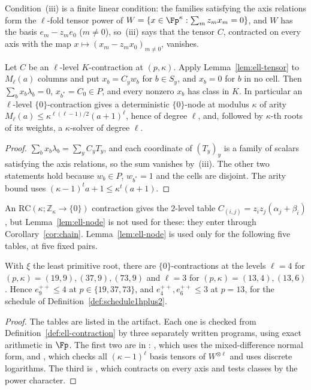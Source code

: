 Condition~(iii) is a finite linear condition: the families satisfying the axis relations form the $\ell$-fold tensor power of $W = \{x \in \Fp^{\kappa} : \sum_mz_mx_m = 0\}$, and $W$ has the basis $e_m - z_me_0$ ($m \ne 0$), so~(iii) says that the tensor $C$, contracted on every axis with the map $x \mapsto (x_m - z_mx_0)_{m \ne 0}$, vanishes.

\begin{lemma}
\label{lem:ell-node}
Let $C$ be an $\ell$-level $K$-contraction at $(p,\kappa)$. Apply Lemma~\ref{lem:ell-tensor} to $M_\ell(a)$ columns and put $x_b = C_yw_b$ for $b \in S_y$, and $x_b = 0$ for $b$ in no cell. Then $\sum_bx_b\lambda_b = 0$, $x_{b^\ast} = C_0 \in P$, and every nonzero $x_b$ has class in $K$. In particular an $\ell$-level $\{0\}$-contraction gives a deterministic $\{0\}$-node at modulus $\kappa$ of arity $M_\ell(a) \le \kappa^{\ell(\ell-1)/2}(a+1)^\ell$, hence of degree $\ell$, and, followed by $\kappa$-th roots of its weights, a $\kappa$-solver of degree $\ell$.
\end{lemma}

\begin{proof}
$\sum_bx_b\lambda_b = \sum_yC_yT_y$, and each coordinate of $(T_y)_y$ is a family of scalars satisfying the axis relations, so the sum vanishes by~(iii). The other two statements hold because $w_b \in P$, $w_{b^\ast} = 1$ and the cells are disjoint. The arity bound uses $(\kappa-1)^ta + 1 \le \kappa^t(a+1)$.
\end{proof}

An $\mathrm{RC}(\kappa;\mathbb{Z}_\kappa\to\{0\})$ contraction gives the $2$-level table $C_{(i,j)} = z_iz_j(\alpha_j+\beta_i)$, but Lemma~\ref{lem:ell-node} is not used for these: they enter through Corollary~\ref{cor:chain}. Lemma~\ref{lem:ell-node} is used only for the following five tables, at five fixed pairs.

\begin{proposition}
\label{prop:ell-tables}
With $\xi$ the least primitive root, there are $\{0\}$-contractions at the levels $\ell = 4$ for $(p,\kappa) = (19,9), (37,9), (73,9)$ and $\ell = 3$ for $(p,\kappa) = (13,4), (13,6)$. Hence $e^{++}_9 \le 4$ at $p \in \{19,37,73\}$, and $e^{++}_4, e^{++}_6 \le 3$ at $p = 13$, for the schedule of Definition~\ref{def:schedule1hplus2}.
\end{proposition}

\begin{proof}
The tables are listed in the artifact. Each one is checked from Definition~\ref{def:ell-contraction} by three separately written programs, using exact arithmetic in $\Fp$. The first two are in : , which uses the mixed-difference normal form, and , which checks all $(\kappa-1)^\ell$ basis tensors of $W^{\otimes\ell}$ and uses discrete logarithms. The third is , which contracts on every axis and tests classes by the power character.
\end{proof}

